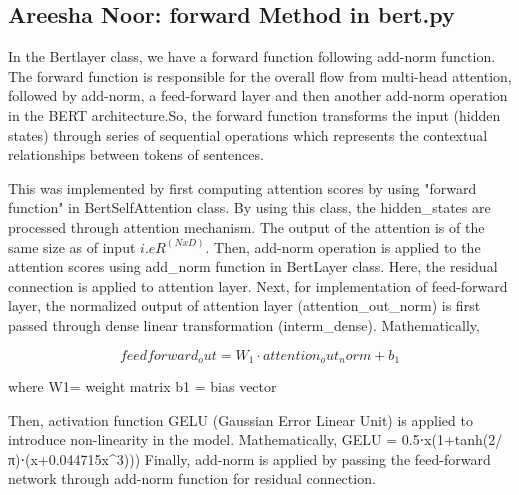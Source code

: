 \documentclass{article}
\begin{document}
\subsection{Areesha Noor: forward Method in bert.py}
In the Bertlayer class, we have a forward function following add-norm function. The forward function is responsible for the overall flow from multi-head attention, followed by add-norm, a  feed-forward layer and then another add-norm operation in the BERT architecture.So, the forward function transforms the input (hidden states) through series of sequential operations which represents the contextual relationships between tokens of sentences.

This was implemented by first computing attention scores by using "forward function" in  BertSelfAttention class. By using this class, the hidden_states are processed through attention mechanism. The output of the attention is of the same size as of input \(i.e R^(NxD) \). Then, add-norm operation is applied to the attention scores using add\_norm function in BertLayer class. Here, the residual connection is applied to attention layer. Next, for implementation of feed-forward layer, the normalized output of attention layer (attention\_out\_norm) is first passed through dense linear transformation (interm\_dense). Mathematically, 

\begin{equation} \label{eqn}
feedforward_out=W_1⋅attention_out_norm+b_1
\end{equation}

where 
W1= weight matrix 
b1 = bias vector 

Then, activation function GELU (Gaussian Error Linear Unit) is applied to introduce non-linearity in the model. Mathematically,
GELU = 0.5⋅x(1+tanh(2/π)⋅(x+0.044715x^3)))
 Finally, add-norm is applied by passing the feed-forward network through add-norm function for residual connection.
\end{document}
